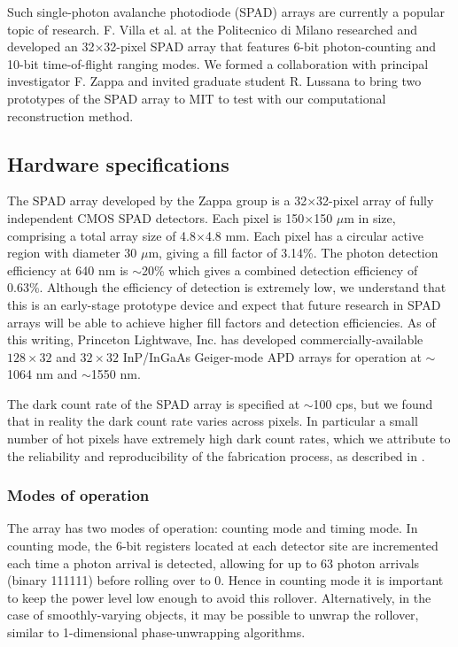 Such single-photon avalanche photodiode (SPAD) arrays are currently a popular topic of research. F. Villa et al. at the Politecnico di Milano researched and developed an 32$\times$32-pixel SPAD array \cite{villa-thesis} that features 6-bit photon-counting and 10-bit time-of-flight ranging modes. We formed a collaboration with principal investigator F. Zappa and invited graduate student R. Lussana to bring two prototypes of the SPAD array to MIT to test with our computational reconstruction method.

\subsection{Hardware specifications}
The SPAD array developed by the Zappa group is a 32$\times$32-pixel array of fully independent CMOS SPAD detectors. Each pixel is 150$\times$150 $\mu$m in size, comprising a total array size of 4.8$\times$4.8 mm. Each pixel has a circular active region with diameter 30 $\mu$m, giving a fill factor of 3.14\%. The photon detection efficiency at 640 nm is $\sim$20\% which gives a combined detection efficiency of 0.63\%. Although the efficiency of detection is extremely low, we understand that this is an early-stage prototype device and expect that future research in SPAD arrays will be able to achieve higher fill factors and detection efficiencies. As of this writing, Princeton Lightwave, Inc. \cite{princetonlightwave} has developed commercially-available $128 \times 32$ and $32 \times 32$ InP/InGaAs Geiger-mode APD arrays for operation at $\sim$1064 nm and $\sim$1550 nm.

The dark count rate of the SPAD array is specified at $\sim$100 cps, but we found that in reality the dark count rate varies across pixels. In particular a small number of hot pixels have extremely high dark count rates, which we attribute to the reliability and reproducibility of the fabrication process, as described in \cite{villa-thesis}.

\subsubsection{Modes of operation}

The array has two modes of operation: counting mode and timing mode. In counting mode, the 6-bit registers located at each detector site are incremented each time a photon arrival is detected, allowing for up to 63 photon arrivals (binary 111111) before rolling over to 0. Hence in counting mode it is important to keep the power level low enough to avoid this rollover. Alternatively, in the case of smoothly-varying objects, it may be possible to unwrap the rollover, similar to 1-dimensional phase-unwrapping algorithms.

